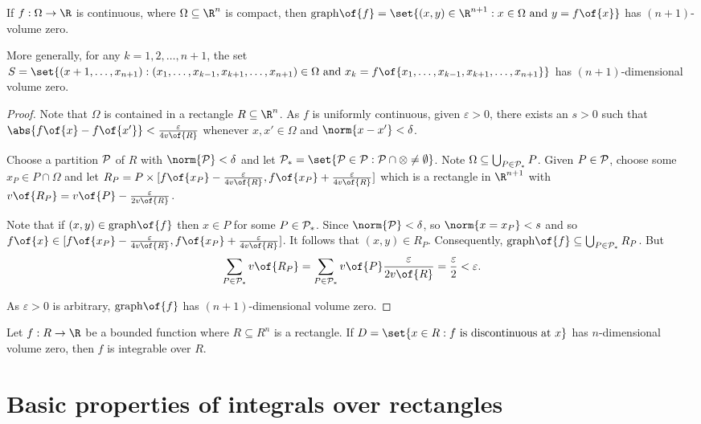 \begin{proposition}
    If $f: \Omega \to \R$ is continuous, where $\Omega \subseteq \R^n$ is compact, then $\mathrm{graph}\of{f} = \set{(x,y) \in \R^{n+1}: x \in \Omega \text{ and } y = f\of{x}}$ has $(n+1)$-volume zero.

    More generally, for any $k = 1,2,\dots,n+1$, the set $S = \set{(x+1, \dots, x_{n+1}): (x_1, \dots, x_{k-1}, x_{k+1}, \dots, x_{n+1}) \in \Omega \text{ and } x_k = f\of{x_1, \dots, x_{k-1}, x_{k+1}, \dots, x_{n+1}}}$ has $(n+1)$-dimensional volume zero.
\end{proposition}
\begin{proof}
    Note that $\Omega$ is contained in a rectangle $R \subseteq \R^n$. As $f$ is uniformly continuous, given $\varepsilon > 0$, there exists an $s > 0$ such that $\abs{f\of{x} - f\of{x'}} < \frac{\varepsilon}{4v\of{R}}$ whenever $x, x' \in \Omega$ and $\norm{x - x'} < \delta$.

    Choose a partition $\cal{P}$ of $R$ with $\norm{\cal{P}} < \delta$ and let $\cal{P}_* = \set{P \in \cal{P}: P \cap \Omega \neq \emptyset}$. Note $\Omega \subseteq \bigcup_{P \in \cal{P}_*} P$. Given $P \in \cal{P}$, choose some $x_P \in P \cap \Omega$ and let $R_P = P \times [f\of{x_P} - \frac{\varepsilon}{4v\of{R}}, f\of{x_P} + \frac{\varepsilon}{4v\of{R}}]$ which is a rectangle in $\R^{n+1}$ with $v\of{R_P} = v\of{P} - \frac{\varepsilon}{2v\of{R}}$.

    Note that if $(x,y) \in \mathrm{graph}\of{f}$ then $x \in P$ for some $P \in \cal{P}_*$. Since $\norm{\cal{P}} < \delta$, so $\norm{x = x_P} < s$ and so $f\of{x} \in [f\of{x_P} - \frac{\varepsilon}{4v\of{R}}, f\of{x_P} + \frac{\varepsilon}{4v\of{R}}]$. It follows that $(x,y) \in R_P$. Consequently, $\mathrm{graph}\of{f} \subseteq \bigcup_{P \in \cal{P}_*} R_P$. But \[\sum_{P \in \cal{P}_*} v\of{R_P} = \sum_{P \in \cal{P}_*} v\of{P} \frac{\varepsilon}{2v\of{R}} = \frac{\varepsilon}{2} < \varepsilon.\]

    As $\varepsilon > 0$ is arbitrary, $\mathrm{graph}\of{f}$ has $(n+1)$-dimensional volume zero.
\end{proof}

\begin{theorem}
    Let $f: R \to \R$ be a bounded function where $R \subseteq R^n$ is a rectangle. If $D = \set{x \in R: f \text{ is discontinuous at } x}$ has $n$-dimensional volume zero, then $f$ is integrable over $R$.
\end{theorem}

\section{Basic properties of integrals over rectangles}

